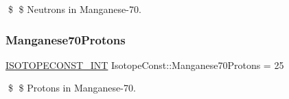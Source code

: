 \$ \$ Neutrons in Manganese-\/70. \mbox{\label{group___isotope_const-_manganese-_mn70_ga5a5fa29f468de710ff3971e7ee89c516}} 
\subsubsection{\texorpdfstring{Manganese70\+Protons}{Manganese70Protons}}
{\footnotesize\ttfamily \mbox{\hyperlink{group___isotope_const-_macros_ga5f18360b3e99483a35c32d789e62621c}{I\+S\+O\+T\+O\+P\+E\+C\+O\+N\+S\+T\+\_\+\+I\+NT}} Isotope\+Const\+::\+Manganese70\+Protons = 25}

\$ \$ Protons in Manganese-\/70. 